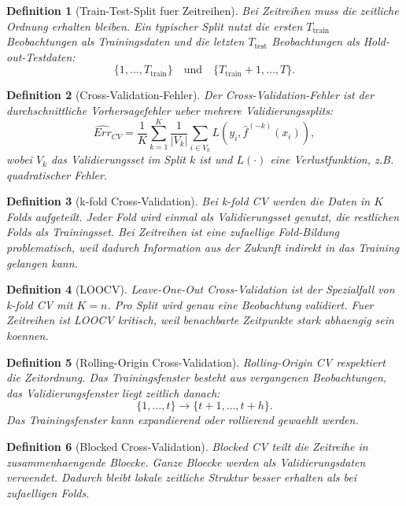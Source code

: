 \documentclass[11pt,a4paper]{article}
\newtheorem{definition}{Definition}
\begin{document}
\begin{definition}[Train-Test-Split fuer Zeitreihen]
Bei Zeitreihen muss die zeitliche Ordnung erhalten bleiben. Ein typischer Split
nutzt die ersten $T_{\text{train}}$ Beobachtungen als Trainingsdaten und die
letzten $T_{\text{test}}$ Beobachtungen als Hold-out-Testdaten:
\[
  \{1,\ldots,T_{\text{train}}\}
  \quad \text{und} \quad
  \{T_{\text{train}}+1,\ldots,T\}.
\]
\end{definition}

\begin{definition}[Cross-Validation-Fehler]
Der Cross-Validation-Fehler ist der durchschnittliche Vorhersagefehler ueber
mehrere Validierungssplits:
\[
  \widehat{Err}_{CV}
  =
  \frac{1}{K}\sum_{k=1}^{K}
  \frac{1}{|V_k|}
  \sum_{i \in V_k}
  L(y_i, \hat{f}^{(-k)}(x_i)),
\]
wobei $V_k$ das Validierungsset im Split $k$ ist und $L(\cdot)$ eine
Verlustfunktion, z.B. quadratischer Fehler.
\end{definition}

\begin{definition}[k-fold Cross-Validation]
Bei k-fold CV werden die Daten in $K$ Folds aufgeteilt. Jeder Fold wird einmal
als Validierungsset genutzt, die restlichen Folds als Trainingsset. Bei
Zeitreihen ist eine zufaellige Fold-Bildung problematisch, weil dadurch
Information aus der Zukunft indirekt in das Training gelangen kann.
\end{definition}

\begin{definition}[LOOCV]
Leave-One-Out Cross-Validation ist der Spezialfall von k-fold CV mit
$K = n$. Pro Split wird genau eine Beobachtung validiert. Fuer Zeitreihen ist
LOOCV kritisch, weil benachbarte Zeitpunkte stark abhaengig sein koennen.
\end{definition}

\begin{definition}[Rolling-Origin Cross-Validation]
Rolling-Origin CV respektiert die Zeitordnung. Das Trainingsfenster besteht aus
vergangenen Beobachtungen, das Validierungsfenster liegt zeitlich danach:
\[
  \{1,\ldots,t\} \rightarrow \{t+1,\ldots,t+h\}.
\]
Das Trainingsfenster kann expandierend oder rollierend gewaehlt werden.
\end{definition}

\begin{definition}[Blocked Cross-Validation]
Blocked CV teilt die Zeitreihe in zusammenhaengende Bloecke. Ganze Bloecke
werden als Validierungsdaten verwendet. Dadurch bleibt lokale zeitliche Struktur
besser erhalten als bei zufaelligen Folds.
\end{definition}
\end{document}
